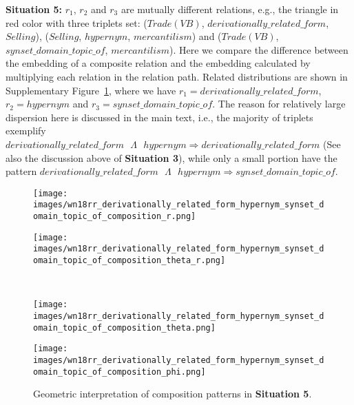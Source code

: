 \documentclass[11pt]{article}
\begin{document}
\textbf{Situation 5:} \(r_1\), \(r_2\) and \(r_3\) are mutually different relations, e.g., the triangle in red color with three triplets set: (\(Trade(VB)\), \(derivationally\_related\_form\), \(Selling\)), (\(Selling\), \(hypernym\), \(mercantilism\)) and (\(Trade(VB)\), \(synset\_domain\_topic\_of\), \(mercantilism\)). Here we compare the difference between the embedding of a composite relation and the embedding calculated by multiplying each relation in the relation path. Related distributions are shown in Supplementary Figure~\ref{105}, where we have \(r_1=derivationally\_related\_form\), \(r_2=hypernym\) and \(r_3=synset\_domain\_topic\_of\). The reason for relatively large dispersion here is discussed in the main text, i.e., the majority of triplets exemplify \(derivationally\_related\_form \text{ }\Lambda \text{ } hypernym \Rightarrow derivationally\_related\_form\) (See also the discussion above of \textbf{Situation 3}), while only a small portion have the pattern \(derivationally\_related\_form \text{ } \Lambda \text{ } hypernym \Rightarrow synset\_domain\_topic\_of\). 

\begin{figure}[htbp]
\centering
\begin{minipage}{3.5cm}
\centering
\texttt{[image: images/wn18rr\_derivationally\_related\_form\_hypernym\_synset\_domain\_topic\_of\_composition\_r.png]}
\end{minipage}
\begin{minipage}{3.5cm}
\centering
\texttt{[image: images/wn18rr\_derivationally\_related\_form\_hypernym\_synset\_domain\_topic\_of\_composition\_theta\_r.png]}
\end{minipage}
\\
\begin{minipage}{3.5cm}
\centering
\texttt{[image: images/wn18rr\_derivationally\_related\_form\_hypernym\_synset\_domain\_topic\_of\_composition\_theta.png]}
\end{minipage}
\begin{minipage}{3.5cm}
\centering
\texttt{[image: images/wn18rr\_derivationally\_related\_form\_hypernym\_synset\_domain\_topic\_of\_composition\_phi.png]}
\end{minipage}
\caption{Geometric interpretation of composition patterns in \textbf{Situation 5}.}
\label{105}
\end{figure}
\end{document}
